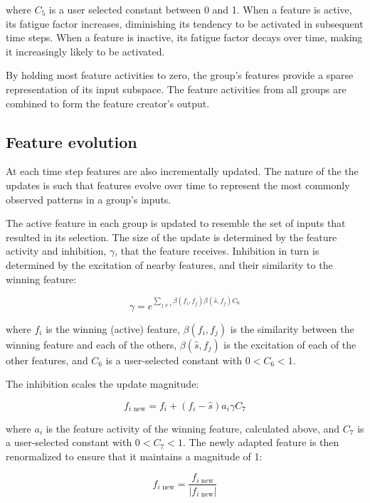 where $C_5$ is a user selected constant between 0 and 1. When a feature is active, its fatigue factor increases, diminishing its tendency to be activated in subsequent time steps. When a feature is inactive, its fatigue factor decays over time, making it increasingly likely to be activated.

By holding most feature activities to zero, the group's features provide a sparse representation of its input subspace. The feature activities from all groups are combined to form the feature creator's output.

\subsection{Feature evolution}

At each time step features are also incrementally updated. The nature of the the updates is such that features evolve over time to represent the most commonly observed patterns in a group's inputs.

The active feature in each group is updated to resemble the set of inputs that resulted in its selection. The size of the update is determined by the feature activity and inhibition, $\gamma$, that the feature receives. Inhibition in turn is determined by the excitation of nearby features, and their similarity to the winning feature:

\begin{equation}
\gamma = e^{\sum_{j \neq i}{\beta(f_i, f_j)\beta(\hat{s}, f_j) C_6}}
\end{equation} 

where $f_i$ is the winning (active) feature, $\beta(f_i, f_j)$ is the similarity between the winning feature and each of the others, $\beta(\hat{s}, f_j) $ is the excitation of each of the other features, and $C_6$ is a user-selected constant with $0 < C_6 < 1$. 

The inhibition scales the update magnitude:

\begin{equation}
f_{i \mbox{ new}} = f_i + (f_i - \hat{s}) a_i \gamma C_7
\end{equation}

where $a_i$ is the feature activity of the winning feature, calculated above, and $C_7$ is a user-selected constant with $0 < C_7 < 1$. The newly adapted feature is then renormalized to ensure that it maintains a magnitude of 1:

\begin{equation}
 f_{i \mbox{ new}} = \frac{f_{i \mbox{ new}}}{|f_{i \mbox{ new}}|}
 \end{equation}
 
